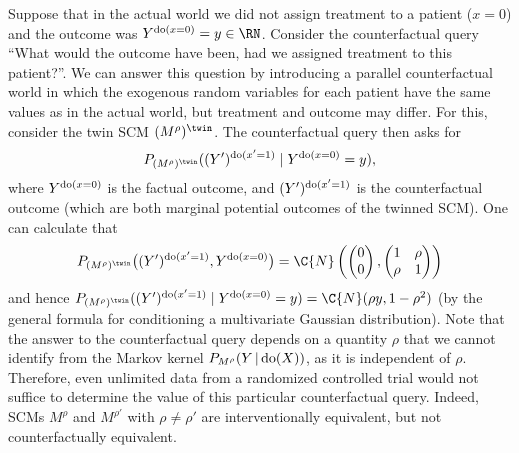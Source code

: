 \begin{Eg}
Suppose that in the actual world we did not assign treatment to a patient ($x=0$) and the outcome was $Y^{\doit(x=0)}=y \in\RN$.
Consider the counterfactual query ``What would the outcome have been, had we assigned treatment to this patient?''. 
We can answer this question by introducing a parallel counterfactual world in which the exogenous random variables for each
patient have the same values as in the actual world, but treatment and outcome may differ. For this, consider the
twin SCM $(M^{\rho})^{\twin}$.
The counterfactual query then asks for 
  $$P_{(M^{\rho})^{\twin}}((Y')^{\doit(x'=1)}\mid Y^{\doit(x=0)}=y),$$
where $Y^{\operatorname{do}(x=0)}$ is the factual outcome, and $(Y')^{\operatorname{do}(x'=1)}$ is the counterfactual outcome (which are both marginal potential outcomes of the twinned SCM). One can calculate that
$$
  P_{(M^{\rho})^{\twin}}\big((Y')^{\doit(x'=1)},Y^{\doit(x=0)}\big) = \C{N}\left(\begin{pmatrix}0\\ 0\end{pmatrix}, \begin{pmatrix} 1 & \rho \\ \rho & 1 \end{pmatrix}\right)
$$
and hence $P_{(M^{\rho})^{\twin}}((Y')^{\doit(x'=1)} \mid Y^{\doit(x=0)}=y) = \C{N}(\rho y,1-\rho^2)$ (by the general formula for conditioning a multivariate Gaussian distribution). Note that the answer to the counterfactual query depends on a quantity $\rho$ that we cannot identify from the Markov kernel $P_{M^{\rho}}(Y\operatorname*{|} \operatorname{do} (X))$, as it is independent of $\rho$. Therefore, even unlimited data from a randomized controlled trial would not suffice to determine the value of this particular counterfactual query.
Indeed, SCMs $M^{\rho}$ and $M^{\rho'}$ with $\rho\neq\rho'$ are interventionally equivalent, but not counterfactually equivalent.
\end{Eg}
